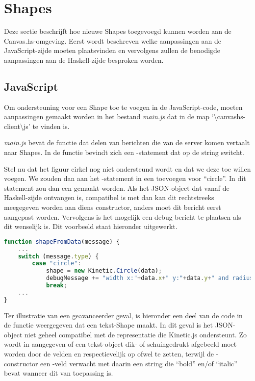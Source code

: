 \section{Shapes} \label{sec:shapesext}
Deze sectie beschrijft hoe nieuwe Shapes toegevoegd kunnen worden aan de Canvas.hs-omgeving. Eerst wordt beschreven welke aanpassingen aan de JavaScript-zijde moeten plaatsvinden en vervolgens zullen de benodigde aanpassingen aan de Haskell-zijde besproken worden.

\subsection{JavaScript}
Om ondersteuning voor een Shape toe te voegen in de JavaScript-code, moeten aanpassingen gemaakt worden in het bestand \emph{main.js} dat in de map `\textbackslash canvashs-client\textbackslash js' te vinden is.

\emph{main.js} bevat de functie  dat delen van berichten die van de server komen vertaalt naar Shapes. In de  functie bevindt zich een -statement dat op de string  switcht.

Stel nu dat het figuur cirkel nog niet ondersteund wordt en dat we deze toe willen voegen. We zouden dan aan het -statement in  een  toevoegen voor ``circle''. In dit  statement zou dan een  gemaakt worden. Als het JSON-object  dat vanaf de Haskell-zijde ontvangen is, compatibel is met  dan kan dit rechtstreeks meegegeven worden aan diens constructor, anders moet dit bericht eerst aangepast worden. Vervolgens is het mogelijk een debug bericht te plaatsen als dit wenselijk is. Dit voorbeeld staat hieronder uitgewerkt.

\begin{lstlisting}[language=JavaScript]
function shapeFromData(message) {
	...
	switch (message.type) {
		case "circle":
			shape = new Kinetic.Circle(data);
			debugMessage += "width x:"+data.x+" y:"+data.y+" and radius:"+data.radius;
			break;
	...
}
\end{lstlisting}

Ter illustratie van een geavanceerder geval, is hieronder een deel van de code in de  functie weergegeven dat een tekst-Shape maakt. In dit geval is het  JSON-object niet geheel compatibel met de representatie die Kinetic.js ondersteunt. Zo wordt in  aangegeven of een tekst-object dik- of schuingedrukt afgebeeld moet worden door de velden  en respectievelijk  op  ofwel  te zetten, terwijl de -constructor een -veld verwacht met daarin een string die ``bold'' en/of ``italic'' bevat wanneer dit van toepassing is.

